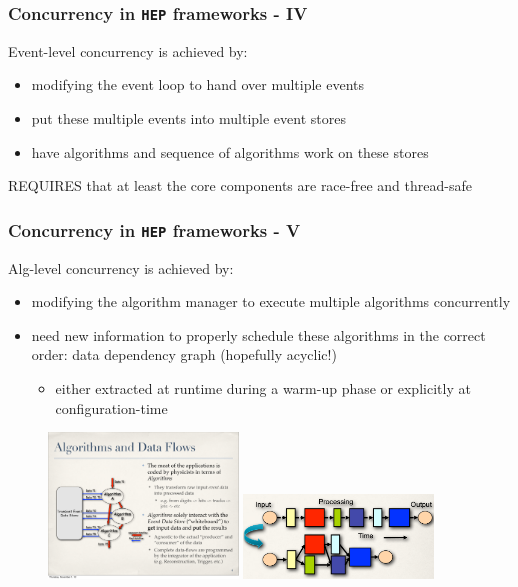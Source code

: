 \documentclass[10pt]{beamer}
\begin{document}
\begin{frame}[fragile]
\frametitle{Concurrency in \verb~HEP~ frameworks - IV}
\label{sec-1-6}


\alert{Event-level} concurrency is achieved by:

\begin{itemize}
\item modifying the event loop to hand over multiple events
\item put these multiple events into multiple event stores
\item have algorithms and sequence of algorithms work on these stores
\end{itemize}

\alert{REQUIRES} that at least the core components are \alert{race-free} and \alert{thread-safe}
\end{frame}
\begin{frame}[fragile]
\frametitle{Concurrency in \verb~HEP~ frameworks - V}
\label{sec-1-7}


\alert{Alg-level} concurrency is achieved by:

\begin{itemize}
\item modifying the algorithm manager to execute multiple algorithms concurrently
\item \alert{need} new information to properly schedule these algorithms in the correct
  order: \alert{data dependency graph} (hopefully acyclic!)
\begin{itemize}
\item either extracted at \alert{runtime} during a warm-up
    phase or \alert{explicitly} at \alert{configuration-time}
\end{itemize}
\end{itemize}

\begin{figure}
  \begin{center}
    \includegraphics[width=0.45\textwidth]{figs/data-flow.pdf}
    \includegraphics[width=0.45\textwidth]{figs/gaudi-hive-1.png}
  \end{center}
\end{figure}
\end{frame}
\end{document}
